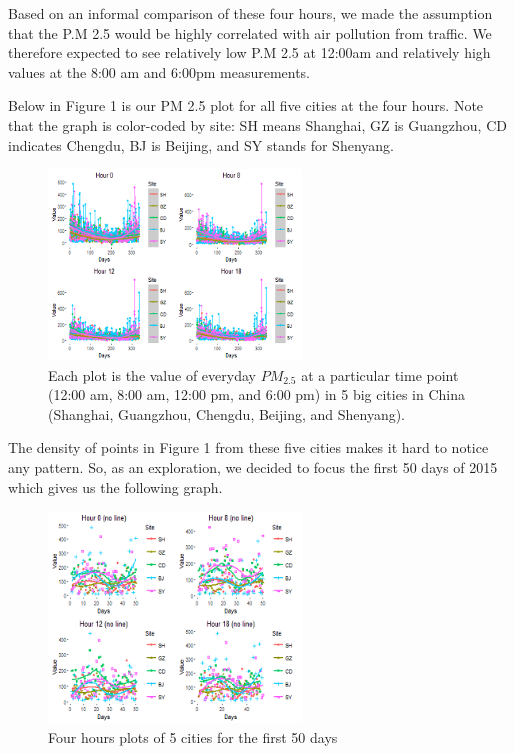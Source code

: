 \documentclass[11pt]{article} %
\begin{document}
	Based on an informal comparison of these four hours, we made the assumption that the P.M 2.5 would be highly correlated with air pollution from traffic. We therefore expected to see relatively low P.M 2.5 at 12:00am and relatively high values at the 8:00 am and 6:00pm measurements.

	Below in Figure 1 is our PM 2.5 plot for all five cities at the four hours. Note that the graph is color-coded by site: SH means Shanghai, GZ is Guangzhou, CD indicates Chengdu, BJ is Beijing, and SY stands for Shenyang. 
	
	 \begin{figure}[!ht]
  \centering
    \includegraphics[width=0.6\textwidth]{Figure1-1}
      \caption{Each plot is the value of everyday \(PM_{2.5}\) at a particular time point (12:00 am, 8:00 am, 12:00 pm, and 6:00 pm) in 5 big cities in China (Shanghai, Guangzhou, Chengdu, Beijing, and Shenyang).
}
\end{figure}

	The density of points in Figure 1 from these five cities makes it hard to notice any pattern. So, as an exploration, we decided to focus the first 50 days of 2015 which gives us the following graph.
	

\begin{figure}[!ht]
  \centering
    \includegraphics[width=0.6\textwidth]{Figure1-2}
      \caption{Four hours plots of 5 cities for the first 50 days}
\end{figure}
\end{document}
